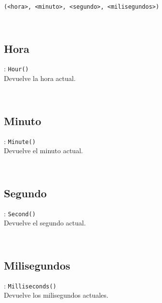       \texttt{(<hora>, <minuto>, <segundo>, <milisegundos>)}
      \\
      
      \begin{fxcode}
         \\
      \end{fxcode}
      
      \subsection*{Hora}: \texttt{Hour()}\\
      Devuelve la hora actual.
      
      \begin{fxcode}
         \\
      \end{fxcode}
      
      \subsection*{Minuto}: \texttt{Minute()}\\
      Devuelve el minuto actual.
      
      \begin{fxcode}
         \\
      \end{fxcode}
      
      \subsection*{Segundo}: \texttt{Second()}\\
      Devuelve el segundo actual.
      
      \begin{fxcode}
         \\
      \end{fxcode}
      
      \subsection*{Milisegundos}: \texttt{Milliseconds()}\\
      Devuelve los milisegundos actuales.
      
      \begin{fxcode}
         \\
      \end{fxcode}
      
